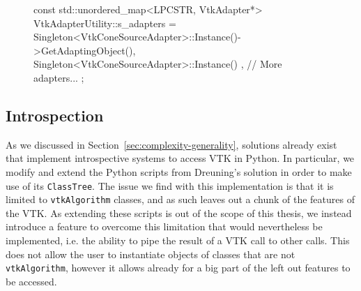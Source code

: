 \begin{figure}
    \centering
    \begin{cpp}[label=lst:adaptersmap,caption={Example of adapters register instantiation.}]
const std::unordered_map<LPCSTR, VtkAdapter*> VtkAdapterUtility::s_adapters =
{
	{ Singleton<VtkConeSourceAdapter>::Instance()->GetAdaptingObject(), Singleton<VtkConeSourceAdapter>::Instance() },
	// More adapters...
};
    \end{cpp}
\end{figure}

\subsection{Introspection}
\label{sec:design-introspection}




As we discussed in Section~\ref{sec:complexity-generality}, solutions already exist that implement introspective systems to access VTK in Python. In particular, we modify and extend the Python scripts from Dreuning's solution in order to make use of its \verb|ClassTree|. The issue we find with this implementation is that it is limited to \verb|vtkAlgorithm| classes, and as such leaves out a chunk of the features of the VTK. As extending these scripts is out of the scope of this thesis, we instead introduce a feature to overcome this limitation that would nevertheless be implemented, i.e. the ability to pipe the result of a VTK call to other calls. This does not allow the user to instantiate objects of classes that are not \verb|vtkAlgorithm|, however it allows already for a big part of the left out features to be accessed.

